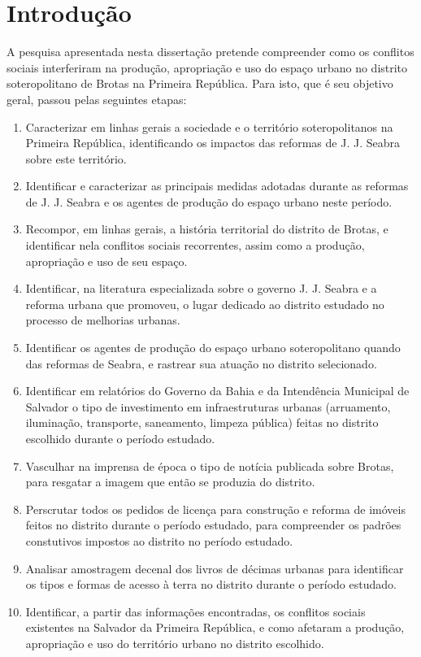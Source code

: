 \chapter[Introdução]{Introdução}\label{ch:intro}

A pesquisa apresentada nesta dissertação pretende compreender como os conflitos sociais interferiram na produção, apropriação e uso do espaço urbano no distrito soteropolitano de Brotas na Primeira República. Para isto, que é seu objetivo geral, passou pelas seguintes etapas:

\begin{enumerate}
\item Caracterizar em linhas gerais a sociedade e o território soteropolitanos na Primeira República, identificando os impactos das reformas de J. J. Seabra sobre este território.
\item Identificar e caracterizar as principais medidas adotadas durante as reformas de J. J. Seabra e os agentes de produção do espaço urbano neste período.
\item Recompor, em linhas gerais, a história territorial do distrito de Brotas, e identificar nela conflitos sociais recorrentes, assim como a produção, apropriação e uso de seu espaço.
\item Identificar, na literatura especializada sobre o governo J. J. Seabra e a reforma urbana que promoveu, o lugar dedicado ao distrito estudado no processo de melhorias urbanas.
\item Identificar os agentes de produção do espaço urbano soteropolitano quando das reformas de Seabra, e rastrear sua atuação no distrito selecionado.
\item Identificar em relatórios do Governo da Bahia e da Intendência Municipal de Salvador o tipo de investimento em infraestruturas urbanas (arruamento, iluminação, transporte, saneamento, limpeza pública) feitas no distrito escolhido durante o período estudado.
\item Vasculhar na imprensa de época o tipo de notícia publicada sobre Brotas, para resgatar a imagem que então se produzia do distrito.
\item Perscrutar todos os pedidos de licença para construção e reforma de imóveis feitos no distrito durante o período estudado, para compreender os padrões constutivos impostos ao distrito no período estudado.
\item Analisar amostragem decenal dos livros de décimas urbanas para identificar os tipos e formas de acesso à terra no distrito durante o período estudado.
\item Identificar, a partir das informações encontradas, os conflitos sociais existentes na Salvador da Primeira República, e como afetaram a produção, apropriação e uso do território urbano no distrito escolhido.
\end{enumerate}

